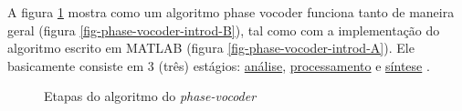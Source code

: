 				A figura \ref{fig-phase-vocoder-introd} mostra como um algoritmo phase vocoder funciona tanto de maneira geral (figura \ref{fig-phase-vocoder-introd-B}), tal como com a implementação do algoritmo escrito em MATLAB (figura \ref{fig-phase-vocoder-introd-A}). Ele basicamente consiste em 3 (três) estágios: \underline{análise}, \underline{processamento} e \underline{síntese} \cite{Portnoff1976}. 
				
				\begin{figure}[ht!]
					\centering
					\qquad
					\caption{Etapas do algoritmo do \textit{phase-vocoder}}
					\label{fig-phase-vocoder-introd}
				\end{figure}
					
